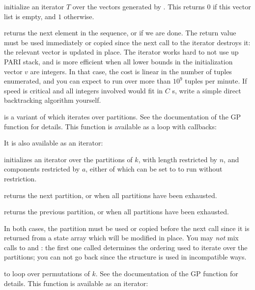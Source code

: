 initialize an iterator $T$ over the vectors generated by
. This returns $0$ if this vector list is
empty, and $1$ otherwise.

 returns the next element in the
 sequence, or  if we are done. The return value must be
used immediately or copied since the next call to the iterator destroys it:
the relevant vector is updated in place. The iterator works hard to not
use up PARI stack, and is more efficient when all lower bounds in the
initialization vector $v$ are integers. In that case, the cost is linear in
the number of tuples enumerated, and you can expect to run over more than
$10^9$ tuples per minute. If speed is critical and all integers involved
would fit in $C$ s, write a simple direct backtracking algorithm
yourself.

\item {} is a variant of  which iterates over
  partitions. See the documentation of the  GP function for
  details. This function is available as a loop with callbacks:


  \noindent It is also available as an iterator:

   initializes an
  iterator over the partitions of $k$, with length restricted by $n$,
  and components restricted by $a$, either of which can be set to 
  to run without restriction.

   returns the next partition, or
   when all partitions have been exhausted.

   returns the previous partition, or
   when all partitions have been exhausted.

  In both cases, the partition must be used or copied before the next call
  since it is returned from a state array which will be modified in place.
  You may \emph{not} mix calls to  and :
  the first one called determines the ordering used to iterate over the
  partitions; you can not go back since the  structure is used
  in incompatible ways.

\item {} to loop over permutations of $k$. See the documentation
  of the  GP function for details. This function is available as
  an iterator:

